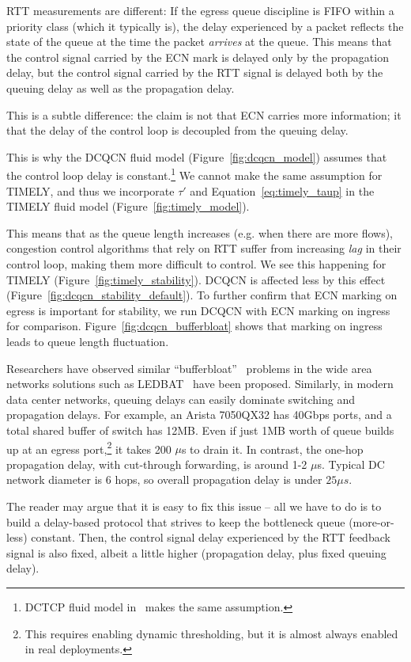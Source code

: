 RTT measurements are different: If the egress queue discipline is FIFO within a
priority class (which it typically is), the delay experienced by a packet
reflects the state of the queue at the time the packet {\em arrives} at the
queue. This means that the control signal carried by the ECN mark is delayed only by
the propagation delay, but the control signal carried by the RTT signal is
delayed both by the queuing delay as well as the propagation delay. 

This is a subtle difference: the claim is not that ECN carries more information;
it that the delay of the control loop is decoupled from the queuing delay.

This is why the DCQCN fluid model (Figure~\ref{fig:dcqcn_model}) assumes that
the control loop delay is constant.\footnote{DCTCP fluid model
in~\cite{dctcp-analysis} makes the same assumption.} We cannot make the same
assumption for TIMELY, and  thus we incorporate $\tau'$ and
Equation~\ref{eq:timely_taup} in the TIMELY fluid model
(Figure~\ref{fig:timely_model}).

This means that as the queue length increases (e.g. when there are more flows),
congestion control algorithms that rely on RTT suffer from increasing {\em lag}
in their control loop, making them more difficult to control. We see this
happening for TIMELY (Figure~\ref{fig:timely_stability}). DCQCN is affected less
by this effect (Figure~\ref{fig:dcqcn_stability_default}). 
To further confirm that ECN marking on egress is important for stability,
we run DCQCN with ECN marking on ingress for comparison.
Figure~\ref{fig:dcqcn_bufferbloat} shows that marking on ingress leads to 
queue length fluctuation.

Researchers have observed similar ``bufferbloat''~\cite{bufferbloat} problems in
the wide area networks solutions such as LEDBAT~\cite{ledbat} have been
proposed. Similarly, in modern data center networks, queuing delays can easily
dominate switching and propagation delays.  For example, an Arista 7050QX32 has
40Gbps ports, and a total shared buffer of switch has 12MB.  Even if just 1MB
worth of queue builds up at an egress port,\footnote{This requires enabling
dynamic thresholding, but it is almost always enabled in real deployments.} it
takes 200 $\mu$s to drain it. In contrast, the one-hop propagation delay, with
cut-through forwarding, is around 1-2 $\mu$s.  Typical DC network diameter is 6
hops, so overall propagation delay is under $25\mu s$.

The reader may argue that it is easy to fix this issue  -- all we have to do is
to build a delay-based protocol that strives to keep the  bottleneck queue
(more-or-less) constant. Then, the control signal delay experienced by the RTT
feedback signal is also fixed, albeit a little higher (propagation delay, plus
fixed queuing delay). 

